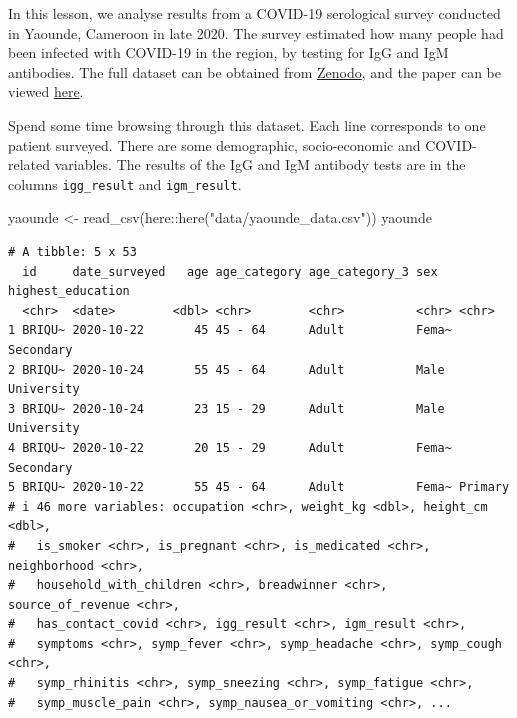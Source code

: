 \documentclass[
  letterpaper,
  DIV=11,
  numbers=noendperiod]{scrreprt}
\newenvironment{Shaded}{\begin{snugshade}}{\end{snugshade}}
\newcommand{\FunctionTok}[1]{\textcolor[rgb]{0.28,0.35,0.67}{#1}}
\newcommand{\NormalTok}[1]{\textcolor[rgb]{0.00,0.23,0.31}{#1}}
\newcommand{\OtherTok}[1]{\textcolor[rgb]{0.00,0.23,0.31}{#1}}
\newcommand{\SpecialCharTok}[1]{\textcolor[rgb]{0.37,0.37,0.37}{#1}}
\newcommand{\StringTok}[1]{\textcolor[rgb]{0.13,0.47,0.30}{#1}}
\begin{document}
In this lesson, we analyse results from a COVID-19 serological survey
conducted in Yaounde, Cameroon in late 2020. The survey estimated how
many people had been infected with COVID-19 in the region, by testing
for IgG and IgM antibodies. The full dataset can be obtained from
\href{https://zenodo.org/record/5218965}{Zenodo}, and the paper can be
viewed \href{https://www.nature.com/articles/s41467-021-25946-0}{here}.

Spend some time browsing through this dataset. Each line corresponds to
one patient surveyed. There are some demographic, socio-economic and
COVID-related variables. The results of the IgG and IgM antibody tests
are in the columns \texttt{igg\_result} and \texttt{igm\_result}.

\begin{Shaded}
\begin{Highlighting}[]
\NormalTok{yaounde }\OtherTok{\textless{}{-}} \FunctionTok{read\_csv}\NormalTok{(here}\SpecialCharTok{::}\FunctionTok{here}\NormalTok{(}\StringTok{"data/yaounde\_data.csv"}\NormalTok{))}
\NormalTok{yaounde  }
\end{Highlighting}
\end{Shaded}

\begin{verbatim}
# A tibble: 5 x 53
  id     date_surveyed   age age_category age_category_3 sex   highest_education
  <chr>  <date>        <dbl> <chr>        <chr>          <chr> <chr>            
1 BRIQU~ 2020-10-22       45 45 - 64      Adult          Fema~ Secondary        
2 BRIQU~ 2020-10-24       55 45 - 64      Adult          Male  University       
3 BRIQU~ 2020-10-24       23 15 - 29      Adult          Male  University       
4 BRIQU~ 2020-10-22       20 15 - 29      Adult          Fema~ Secondary        
5 BRIQU~ 2020-10-22       55 45 - 64      Adult          Fema~ Primary          
# i 46 more variables: occupation <chr>, weight_kg <dbl>, height_cm <dbl>,
#   is_smoker <chr>, is_pregnant <chr>, is_medicated <chr>, neighborhood <chr>,
#   household_with_children <chr>, breadwinner <chr>, source_of_revenue <chr>,
#   has_contact_covid <chr>, igg_result <chr>, igm_result <chr>,
#   symptoms <chr>, symp_fever <chr>, symp_headache <chr>, symp_cough <chr>,
#   symp_rhinitis <chr>, symp_sneezing <chr>, symp_fatigue <chr>,
#   symp_muscle_pain <chr>, symp_nausea_or_vomiting <chr>, ...
\end{verbatim}
\end{document}
